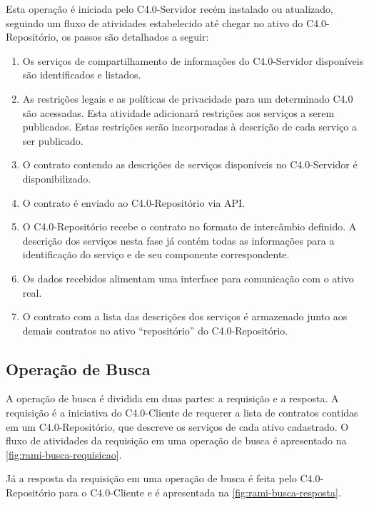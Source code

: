 Esta operação é iniciada pelo C4.0-Servidor recém instalado ou atualizado, seguindo um fluxo de atividades estabelecido até chegar no ativo do C4.0-Repositório, os passos são detalhados a seguir:

\begin{enumerate}

	\item Os serviços de compartilhamento de informações do C4.0-Servidor disponíveis são identificados e listados.

	\item As restrições legais e as políticas de privacidade para um determinado C4.0 são acessadas. Esta atividade adicionará restrições aos serviços a serem publicados. Estas restrições serão incorporadas à descrição de cada serviço a ser publicado.

	\item O contrato contendo as descrições de serviços disponíveis no C4.0-Servidor é disponibilizado.

	\item O contrato é enviado ao C4.0-Repositório via API.

	\item O C4.0-Repositório recebe o contrato no formato de intercâmbio definido. A descrição dos serviços nesta fase já contém todas as informações para a identificação do serviço e de seu componente correspondente.

	\item Os dados recebidos alimentam uma interface para comunicação com o ativo real.

	\item O contrato com a lista das descrições dos serviços é armazenado junto aos demais contratos no ativo ``repositório'' do C4.0-Repositório.

\end{enumerate}

\subsection{Operação de Busca}

A operação de busca é dividida em duas partes: a requisição e a resposta. A requisição é a iniciativa do C4.0-Cliente de requerer a lista de contratos contidas em um C4.0-Repositório, que descreve os serviços de cada ativo cadastrado. O fluxo de atividades da requisição em uma operação de busca é apresentado na \autoref{fig:rami-busca-requisicao}.

Já a resposta da requisição em uma operação de busca é feita pelo C4.0-Repositório para o C4.0-Cliente e é apresentada na \autoref{fig:rami-busca-resposta}.

